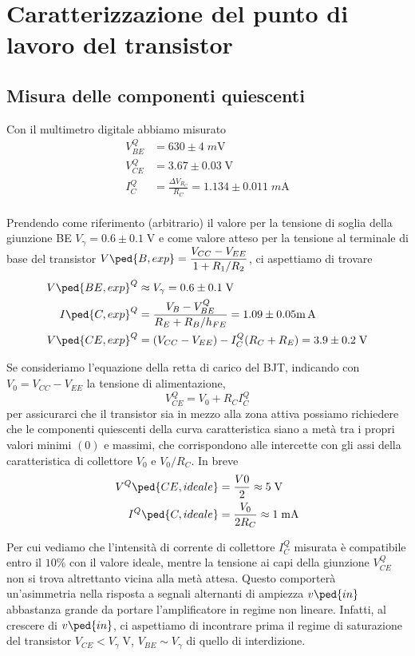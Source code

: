 \documentclass[10pt,a4paper]{article}
\begin{document}
\section{Caratterizzazione del punto di lavoro del transistor}
\subsection{Misura delle componenti quiescenti}
Con il multimetro digitale abbiamo misurato
\begin{align*}
V_{BE}^Q &= 630 \pm 4 \; \si{m\V} \\
V_{CE}^Q &= 3.67 \pm 0.03 \; \si{\V} \\
I_C^Q &= \frac{\Delta V_{R_C}}{R_C} = 1.134 \pm 0.011 \; \si{m\A} \\
\end{align*}

Prendendo come riferimento (arbitrario) il valore per la tensione di soglia
della giunzione BE $V_\gamma = 0.6 \pm 0.1 \; \si{\V}$ e come valore atteso
per la tensione al terminale di base del transistor
$\ds V\ped{B, exp} = \frac{V_{CC} - V_{EE}}{1 + R_1/R_2}$, ci aspettiamo di
trovare
\begin{align*}
V\ped{BE, exp}^Q &\approx V_\gamma = 0.6 \pm 0.1 \; \si{\V} \\
I\ped{C, exp}^Q &= \frac{V_B - V_{BE}^Q}{R_E + R_B/h_{FE}} =
1.09 \pm 0.05 \si{\m\A} \\
V\ped{CE, exp}^Q &= (V_{CC} - V_{EE}) - I_C^Q(R_C + R_E) = 3.9 \pm 0.2 \;
\si{\V}
\end{align*}

Se consideriamo l'equazione della retta di carico del BJT, indicando con
$V_0 = V_{CC} - V_{EE}$ la tensione di alimentazione,
\begin{equation*}
V_{CE}^Q = V_0 + R_C I_C^Q
\end{equation*}
per assicurarci che il transistor sia in mezzo alla zona attiva possiamo
richiedere che le componenti quiescenti della curva caratteristica siano a
metà tra i propri valori minimi $(0)$ e massimi, che corrispondono alle
intercette con gli assi della caratteristica di collettore $V_0$ e $V_0/R_C$.
In breve
\begin{align*}
V^Q\ped{CE, ideale} &= \frac{V0}{2} \approx 5 \; \si{\V} \\
I^Q\ped{C, ideale} &= \frac{V_0}{2R_C} \approx 1 \; \si{\mA}
\end{align*}

Per cui vediamo che l'intensità di corrente di collettore $I_C^Q$ misurata è
compatibile entro il $10 \%$ con il valore ideale, mentre la tensione ai capi
della giunzione $V_{CE}^Q$ non si trova altrettanto vicina alla metà attesa.
Questo comporterà un'asimmetria nella risposta a segnali alternanti di
ampiezza $v\ped{in}$ abbastanza grande da portare l'amplificatore in regime
non lineare. Infatti, al crescere di $v\ped{in}$, ci aspettiamo di incontrare
prima il regime di saturazione del transistor $V_{CE} < V_\gamma \; \si{\V}$,
$V_{BE} \sim V_\gamma$ di quello di interdizione.
\end{document}
